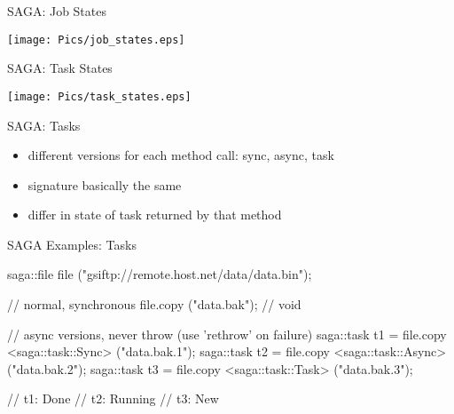 \documentclass[%
  pdf,
  colorBG,
  slideColor,
  frames,
  ogf
]{prosper}
\newcommand{\dn}{\vspace*{+1em}}
\begin{document}

 \begin{slide}{SAGA: Job States}
   \begin{center}
   \texttt{[image: Pics/job\_states.eps]}
   \end{center}
 \end{slide}


 \begin{slide}{SAGA: Task States}
   \begin{center}
   \texttt{[image: Pics/task\_states.eps]}
   \end{center}
 \end{slide}


 \begin{slide}{SAGA: Tasks}

 \dn 

  \begin{itemize}
   \item different versions for each method call: sync, async, task
   \item signature basically the same
   \item differ in state of task returned by that method
  \end{itemize}

 \end{slide}


 \begin{slide}{SAGA Examples: Tasks}

  \begin{mycode}[label=tasks (i)]

  saga::file file ("gsiftp://remote.host.net/data/data.bin");

  // normal, synchronous
  file.copy ("data.bak");  // void

  // async versions, never throw (use 'rethrow' on failure)
  saga::task t1 = file.copy <saga::task::Sync>  ("data.bak.1");
  saga::task t2 = file.copy <saga::task::Async> ("data.bak.2");
  saga::task t3 = file.copy <saga::task::Task>  ("data.bak.3");

  // t1: Done
  // t2: Running
  // t3: New

  \end{mycode}
   
 \end{slide}
\end{document}
